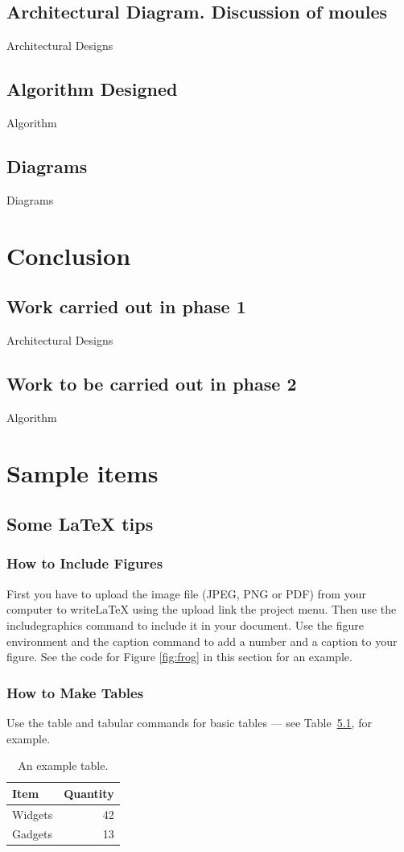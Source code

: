 \documentclass[a4paper]{report}
\begin{document}
    \section{Architectural Diagram. Discussion of moules}
    Architectural Designs
    \section{Algorithm Designed}
    Algorithm 
    \section{Diagrams}
    Diagrams

    \chapter {Conclusion}
    \section{Work carried out in phase 1}
    Architectural Designs
    \section{Work to be carried out in phase 2}
    Algorithm     


    \chapter{Sample items}
    \section{Some LaTeX tips}
    \label{sec:latex}
    \subsection{How to Include Figures}    
    First you have to upload the image file (JPEG, PNG or PDF) from your computer to writeLaTeX using the upload link the project menu. Then use the includegraphics command to include it in your document. Use the figure environment and the caption command to add a number and a caption to your figure. See the code for Figure \ref{fig:frog} in this section for an example.            
    \subsection{How to Make Tables}    
    Use the table and tabular commands for basic tables --- see Table~\ref{tab:widgets}, for example.    
    \begin{table}
    \centering
    \begin{tabular}{l|r}
    Item & Quantity \\\hline
    Widgets & 42 \\
    Gadgets & 13
    \end{tabular}
    \caption{\label{tab:widgets}An example table.}
    \end{table}    
\end{document}
